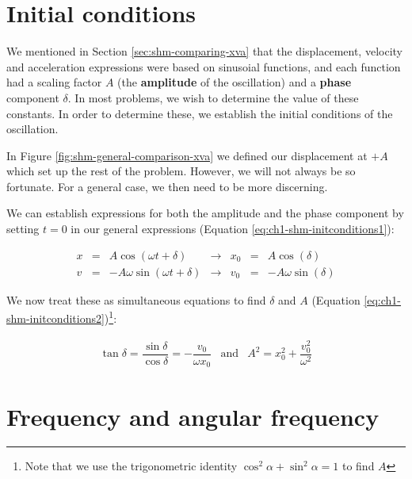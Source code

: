 \documentclass[
]{book}
\begin{document}
\hypertarget{sec:shm-initialconditions}{%
\section{Initial conditions}\label{sec:shm-initialconditions}}

We mentioned in Section \ref{sec:shm-comparing-xva} that the displacement, velocity and acceleration expressions were based on sinusoial functions, and each function had a scaling factor \(A\) (the \textbf{amplitude} of the oscillation) and a \textbf{phase} component \(\delta\). In most problems, we wish to determine the value of these constants. In order to determine these, we establish the initial conditions of the oscillation.

In Figure \ref{fig:shm-general-comparison-xva} we defined our displacement at \(+A\) which set up the rest of the problem. However, we will not always be so fortunate. For a general case, we then need to be more discerning.

We can establish expressions for both the amplitude and the phase component by setting \(t = 0\) in our general expressions (Equation \eqref{eq:ch1-shm-initconditions1}):

\begin{equation}
\begin{array}{rclcrcl}
x &=& A  \cos (\omega t + \delta)       & \rightarrow & x_0 &=& A  \cos (\delta)\\
v &=& -A \omega \sin (\omega t + \delta)& \rightarrow & v_0 &=& -A \omega \sin ( \delta)
\end{array}
\label{eq:ch1-shm-initconditions1}
\end{equation}

We now treat these as simultaneous equations to find \(\delta\) and \(A\) (Equation \eqref{eq:ch1-shm-initconditions2})\footnote{Note that we use the trigonometric identity \(\cos^2 \alpha + \sin^2 \alpha = 1\) to find \(A\)}:

\begin{equation}
\begin{array}{rcl}
\tan \delta = \dfrac{\sin \delta}{\cos \delta} = -\dfrac{v_0}{\omega x_0} & \textrm{and} & A^2 = x_0^2 + \dfrac{v_0^2}{\omega^2}
\end{array}
\label{eq:ch1-shm-initconditions2}
\end{equation}

\hypertarget{sec:shm-freq-angularfreq}{%
\section{Frequency and angular frequency}\label{sec:shm-freq-angularfreq}}
\end{document}
